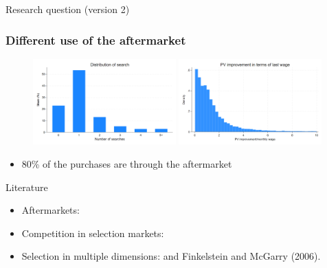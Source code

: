 \documentclass[notes, 10pt,aspectratio=169]{beamer}
\begin{document}
\begin{frame}{Research question (version 2)}
\begin{itemize}
\begin{figure}
    \end{figure}
\end{itemize}
\end{frame}




 


\begin{frame}
\frametitle{Different use of the aftermarket} 
\begin{figure}
    \centering
    \includegraphics[width=0.49\textwidth]{../figures/IE3_dist_external_offers.png}
    \hfill %
    \includegraphics[width=0.49\textwidth]{../figures/IE3_offer_improvement_histogram.png}
    \label{fig:my-figures}
\end{figure}

\begin{itemize}
    \item   80\% of the purchases are through the aftermarket
\end{itemize}
\end{frame}



\begin{frame}{Literature}

\begin{itemize}
    \item Aftermarkets: \textcite{larsen_efficiency_2021, allen_search_2019}

    \item Competition in selection markets: \textcite{mahoney_imperfect_2017, cuesta_price_2018, cosconati_competing_2025}

    \item Selection in multiple dimensions: \textcite{finkelstein_adverse_2004} and Finkelstein and McGarry (2006).  
\end{itemize}
\end{frame}
\end{document}
